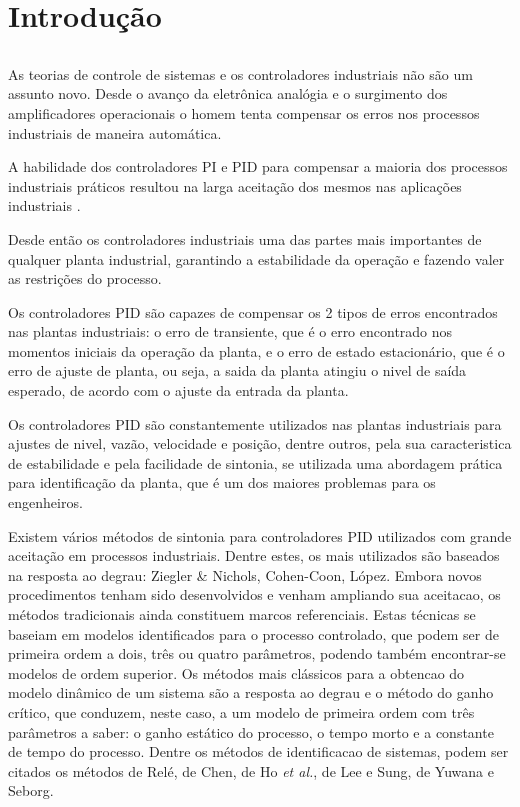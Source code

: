 \chapter{Introdução\label{cap:introducao}}

\section*{}

    As teorias de controle de sistemas e os controladores industriais não são um assunto
    novo. Desde o avanço da eletrônica analógia e o surgimento dos amplificadores
    operacionais o homem tenta compensar os erros nos processos industriais de maneira
    automática.

    A habilidade dos controladores \ac{PI} e \ac{PID} para compensar a maioria dos processos
    industriais práticos resultou na larga aceitação dos mesmos nas aplicações industriais
    \cite{Dwyer}.

    Desde então os controladores industriais uma das partes mais importantes de qualquer
    planta industrial, garantindo a estabilidade da operação e fazendo valer as restrições
    do processo.

    Os controladores \acs{PID} são capazes de compensar os 2 tipos de erros encontrados
    nas plantas industriais: o erro de transiente, que é o erro encontrado nos momentos
    iniciais da operação da planta, e o erro de estado estacionário, que é o erro de
    ajuste de planta, ou seja, a saida da planta atingiu o nivel de saída esperado, de
    acordo com o ajuste da entrada da planta.

    Os controladores \acs{PID} são constantemente utilizados nas plantas industriais para
    ajustes de nivel, vazão, velocidade e posição, dentre outros, pela sua caracteristica
    de estabilidade e pela facilidade de sintonia, se utilizada uma abordagem prática
    para identificação da planta, que é um dos maiores problemas para os engenheiros.

    Existem vários métodos de sintonia para controladores PID utilizados com grande
    aceitação em processos industriais. Dentre estes, os mais utilizados são baseados na
    resposta ao degrau: Ziegler \& Nichols, Cohen-Coon, López. Embora novos procedimentos
    tenham sido desenvolvidos e venham ampliando sua aceitacao, os métodos tradicionais
    ainda constituem marcos referenciais. Estas técnicas se baseiam em modelos identificados
    para o processo controlado, que podem ser de primeira ordem a dois, três ou quatro
    parâmetros, podendo também encontrar-se modelos de ordem superior. Os métodos mais
    clássicos para a obtencao do modelo dinâmico de um sistema são a resposta ao degrau
    e o método do ganho crítico, que conduzem, neste caso, a um modelo de primeira ordem
    com três parâmetros a saber: o ganho estático do processo, o tempo morto e a constante 
    de tempo do processo. Dentre os métodos de identificacao de sistemas, podem ser citados
    os métodos de Relé, de Chen, de Ho \textit{et al.}, de Lee e Sung, de Yuwana e Seborg.

